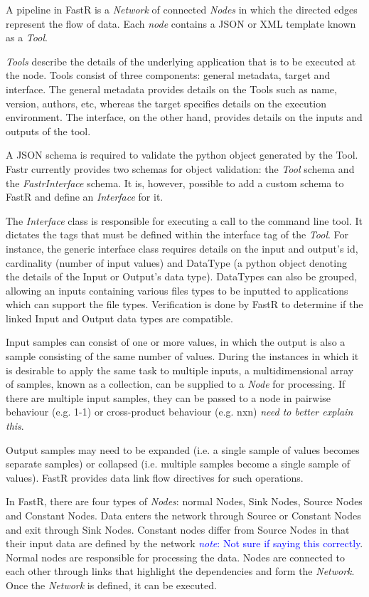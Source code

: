 \documentclass{report}
\newcommand{\note}[1]{\textcolor{blue}{\textit{note}: #1}}
\begin{document}
        A pipeline in FastR is a \textit{Network} of connected \textit{Nodes} in
        which the directed edges represent the flow of data.  Each \textit{node}
        contains a JSON or XML template known as a \textit{Tool}. 

\textit{Tools} describe the details of the underlying application that is to be
executed at the node. Tools consist of three components: general metadata,
target and interface.  The general metadata provides details on the Tools such
as name, version, authors, etc, whereas the target specifies details on the
execution environment.  The interface, on the other hand, provides details on
the inputs and outputs of the tool. 

A JSON schema is required to validate the python object generated by the Tool.
Fastr currently provides two schemas for object validation: the \textit{Tool}
schema and the \textit{FastrInterface} schema. It is, however, possible to add a
custom schema to FastR and define an \textit{Interface} for it. 

The \textit{Interface} class is responsible for executing a call to the command
line tool.  It dictates the tags that must be defined within the interface tag
of the \textit{Tool}. For instance, the generic interface class requires details
on the input and output's id, cardinality (number of input values) and DataType
(a python object denoting the details of the Input or Output's data type).
DataTypes can also be grouped, allowing an inputs containing various files types
to be inputted to applications which can support the file types.  Verification
is done by FastR to determine if the linked Input and Output data types are
compatible.

Input samples can consist of one or more values, in which the output is also a
sample consisting of the same number of values. During the instances in which it
is desirable to apply the same task to multiple inputs, a multidimensional array
of samples, known as a collection, can be supplied to a \textit{Node} for
processing. If there are multiple input samples, they can be passed to a node in
pairwise behaviour (e.g. 1-1) or cross-product behaviour (e.g. nxn) \textit{need
to better explain this}.  

Output samples may need to be expanded (i.e. a single sample of values becomes
separate samples) or collapsed (i.e. multiple samples become a single sample of
values).  FastR provides data link flow directives for such operations.

In FastR, there are four types of \textit{Nodes}: normal Nodes, Sink Nodes,
Source Nodes and Constant Nodes. Data enters the network through Source or
Constant Nodes and exit through Sink Nodes. Constant nodes differ from Source
Nodes in that their input data are defined by the network \note{Not sure if
saying this correctly}. Normal nodes are responsible for processing the data.
Nodes are connected to each other through links that highlight the dependencies
and form the \textit{Network}. Once the \textit{Network} is defined, it can be
executed.
\end{document}
